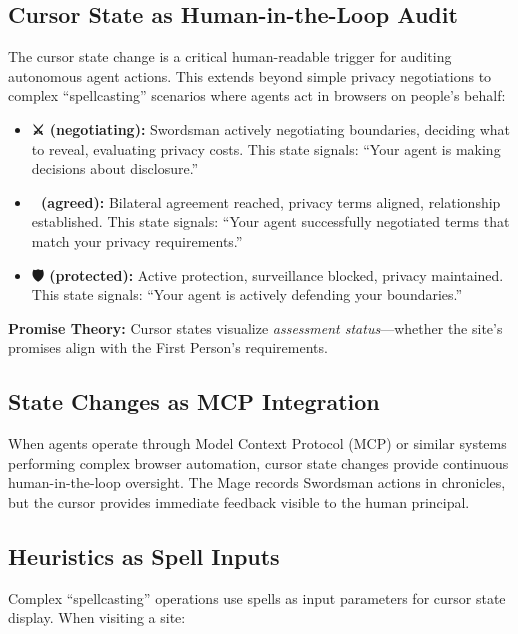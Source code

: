 \documentclass[
]{article}
\begin{document}
\subsection{Cursor State as Human-in-the-Loop
Audit}\label{cursor-state-as-human-in-the-loop-audit}

The cursor state change is a critical human-readable trigger for
auditing autonomous agent actions. This extends beyond simple privacy
negotiations to complex ``spellcasting'' scenarios where agents act in
browsers on people's behalf:

\begin{itemize}
\item
  \textbf{⚔️ (negotiating):} Swordsman actively negotiating boundaries,
  deciding what to reveal, evaluating privacy costs. This state signals:
  ``Your agent is making decisions about disclosure.''
\item
  \textbf{🤝 (agreed):} Bilateral agreement reached, privacy terms
  aligned, relationship established. This state signals: ``Your agent
  successfully negotiated terms that match your privacy requirements.''
\item
  \textbf{🛡️ (protected):} Active protection, surveillance blocked,
  privacy maintained. This state signals: ``Your agent is actively
  defending your boundaries.''
\end{itemize}

\textbf{Promise Theory:} Cursor states visualize \emph{assessment
status}---whether the site's promises align with the First Person's
requirements.

\subsection{State Changes as MCP
Integration}\label{state-changes-as-mcp-integration}

When agents operate through Model Context Protocol (MCP) or similar
systems performing complex browser automation, cursor state changes
provide continuous human-in-the-loop oversight. The Mage records
Swordsman actions in chronicles, but the cursor provides immediate
feedback visible to the human principal.

\subsection{Heuristics as Spell
Inputs}\label{heuristics-as-spell-inputs}

Complex ``spellcasting'' operations use spells as input parameters for
cursor state display. When visiting a site:
\end{document}
